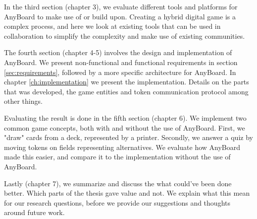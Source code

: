 In the third section (chapter 3), we evaluate different tools and platforms for AnyBoard to make use of or build upon. Creating a hybrid digital game is a complex process, and here we look at existing tools that can be used in collaboration to simplify the complexity and make use of existing communities.

The fourth section (chapter 4-5) involves the design and implementation of AnyBoard. We present non-functional and functional requirements in section \ref{sec:requirements}, followed by a more specific architecture for AnyBoard. In chapter \ref{ch:implementation} we present the implementation. Details on the parts that was developed, the game entities and token communication protocol among other things. 

Evaluating the result is done in the fifth section (chapter 6). We implement two common game concepts, both with and without the use of AnyBoard. First, we "draw" cards from a deck, represented by a printer. Secondly, we answer a quiz by moving tokens on fields representing alternatives. We evaluate how AnyBoard made this easier, and compare it to the implementation without the use of AnyBoard.

Lastly (chapter 7), we summarize and discuss the what could've been done better. Which parts of the thesis gave value and not. We explain what this mean for our research questions, before we provide our suggestions and thoughts around future work.
\newpage
